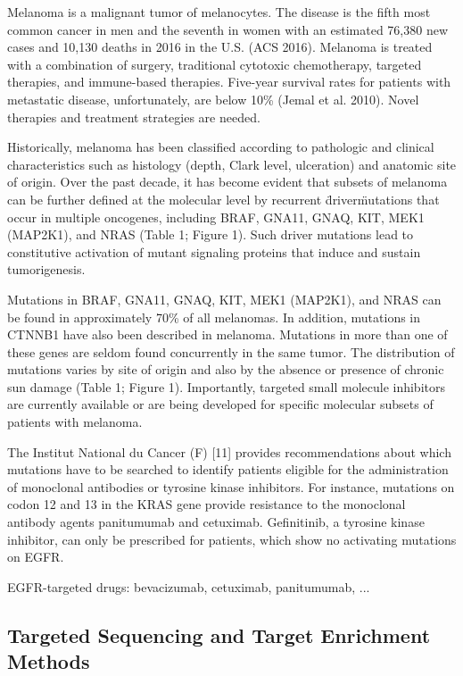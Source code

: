 Melanoma is a malignant tumor of melanocytes. The disease is the fifth most
common cancer in men and the seventh in women with an estimated 76,380 new cases
and 10,130 deaths in 2016 in the U.S. (ACS 2016). Melanoma is treated with a
combination of surgery, traditional cytotoxic chemotherapy, targeted therapies,
and immune-based therapies. Five-year survival rates for patients with
metastatic disease, unfortunately, are below 10\% (Jemal et al. 2010). Novel
therapies and treatment strategies are needed.

Historically, melanoma has been classified according to pathologic and clinical
characteristics such as histology (depth, Clark level, ulceration) and anatomic
site of origin. Over the past decade, it has become evident that subsets of
melanoma can be further defined at the molecular level by recurrent \"driver\"
mutations that occur in multiple oncogenes, including BRAF, GNA11, GNAQ, KIT,
MEK1 (MAP2K1), and NRAS (Table 1; Figure 1). Such driver mutations lead to
constitutive activation of mutant signaling proteins that induce and sustain
tumorigenesis.

Mutations in BRAF, GNA11, GNAQ, KIT, MEK1 (MAP2K1), and NRAS can be found in
approximately 70\% of all melanomas. In addition, mutations in CTNNB1 have also
been described in melanoma. Mutations in more than one of these genes are seldom
found concurrently in the same tumor. The distribution of mutations varies by
site of origin and also by the absence or presence of chronic sun damage (Table
1; Figure 1). Importantly, targeted small molecule inhibitors are currently
available or are being developed for specific molecular subsets of patients with
melanoma.

The Institut National du Cancer (F) [11]
provides recommendations about which mutations have to be searched to identify
patients eligible for the administration of monoclonal antibodies or tyrosine
kinase inhibitors. For instance, mutations on codon 12 and 13 in the KRAS gene
provide resistance to the monoclonal antibody agents panitumumab and cetuximab.
Gefinitinib, a tyrosine kinase inhibitor, can only be prescribed for patients,
which show no activating mutations on EGFR.


EGFR-targeted drugs:
bevacizumab, cetuximab, panitumumab, ...

\subsection{Targeted Sequencing and Target Enrichment Methods}

